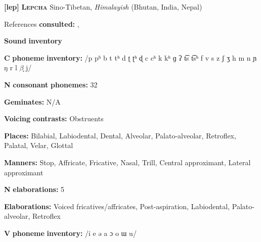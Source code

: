 \documentclass[output=paper]{langsci/langscibook}
\begin{document}
\begin{styleBody}
\textbf{[lep]}   \textbf{\textsc{Lepcha}}    Sino-Tibetan, \textit{Himalayish} (Bhutan, India, Nepal)
\end{styleBody}

\begin{styleBody}
References \textbf{consulted:} \citet{Plaisier2007}, \citet{Sprigg1966}
\end{styleBody}

\begin{styleBody}
\textbf{Sound} \textbf{inventory}
\end{styleBody}

\begin{styleBody}
\textbf{C} \textbf{phoneme} \textbf{inventory:} /p pʰ b t tʰ d ʈ ʈʰ ɖ c cʰ k kʰ ɡ ʔ t͡s t͡sʰ f v s z ʃ ʒ h m n ɲ ŋ r l $\beta ̞$ j/
\end{styleBody}

\begin{styleBody}
\textbf{N} \textbf{consonant} \textbf{phonemes:} 32
\end{styleBody}

\begin{styleBody}
\textbf{Geminates:} N/A
\end{styleBody}

\begin{styleBody}
\textbf{Voicing} \textbf{contrasts:} Obstruents
\end{styleBody}

\begin{styleBody}
\textbf{Places:} Bilabial, Labiodental, Dental, Alveolar, Palato-alveolar, Retroflex, Palatal, Velar, Glottal
\end{styleBody}

\begin{styleBody}
\textbf{Manners:} Stop, Affricate, Fricative, Nasal, Trill, Central approximant, Lateral approximant
\end{styleBody}

\begin{styleBody}
\textbf{N} \textbf{elaborations:} 5
\end{styleBody}

\begin{styleBody}
\textbf{Elaborations:} Voiced fricatives/affricates, Post-aspiration, Labiodental, Palato-alveolar, Retroflex
\end{styleBody}

\begin{styleBody}
\textbf{V} \textbf{phoneme} \textbf{inventory:} /i e ə a ɔ o ɯ u/
\end{styleBody}
\end{document}

